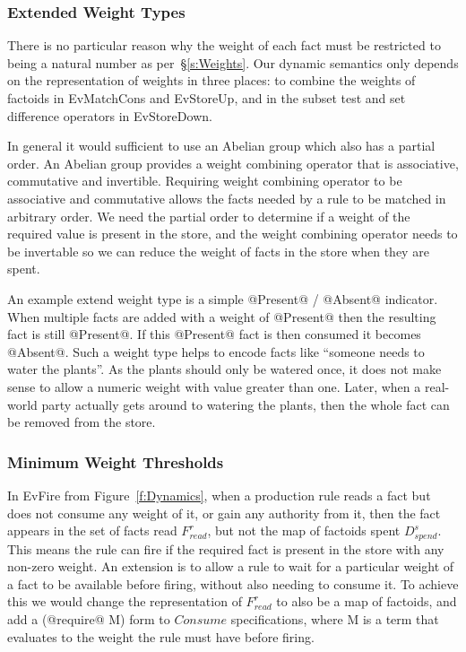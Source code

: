 \subsubsection{Extended Weight Types}
There is no particular reason why the weight of each fact must be restricted to being a natural number as per~\S\ref{s:Weights}. Our dynamic semantics only depends on the representation of weights in three places: to combine the weights of factoids in EvMatchCons and EvStoreUp, and in the subset test and set difference operators in EvStoreDown.

In general it would sufficient to use an Abelian group which also has a partial order. An Abelian group provides a weight combining operator that is associative, commutative and invertible. Requiring weight combining operator to be associative and commutative allows the facts needed by a rule to be matched in arbitrary order. We need the partial order to determine if a weight of the required value is present in the store, and the weight combining operator needs to be invertable so we can reduce the weight of facts in the store when they are spent.

An example extend weight type is a simple @Present@ / @Absent@ indicator. When multiple facts are added with a weight of @Present@ then the resulting fact is still @Present@. If this @Present@ fact is then consumed it becomes @Absent@. Such a weight type helps to encode facts like ``someone needs to water the plants''. As the plants should only be watered once, it does not make sense to allow a numeric weight with value greater than one. Later, when a real-world party actually gets around to watering the plants, then the whole fact can be removed from the store.


\subsubsection{Minimum Weight Thresholds}
In EvFire from Figure~\ref{f:Dynamics}, when a production rule reads a fact but does not consume any weight of it, or gain any authority from it, then the fact appears in the set of facts read $F^r_{read}$, but not the map of factoids spent $D^s_{spend}$. This means the rule can fire if the required fact is present in the store with any non-zero weight. An extension is to allow a rule to wait for a particular weight of a fact to be available before firing, without also needing to consume it. To achieve this we would change the representation of $F^r_{read}$ to also be a map of factoids, and add a (@require@ M) form to $Consume$ specifications, where M is a term that evaluates to the weight the rule must have before firing.


